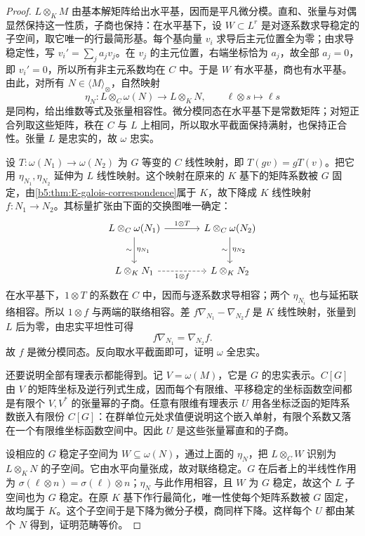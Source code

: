 \begin{proof}
	\(L\otimes_KM\) 由基本解矩阵给出水平基，因而是平凡微分模。直和、张量与对偶显然保持这一性质，子商也保持：在水平基下，设 \(W\subset L^r\) 是对逐系数求导稳定的子空间，取它唯一的行最简形基。每个基向量 \(v_i\) 求导后主元位置全为零；由求导稳定性，写 \(v_i'=\sum_j a_jv_j\)。在 \(v_j\) 的主元位置，右端坐标恰为 \(a_j\)，故全部 \(a_j=0\)，即 \(v_i'=0\)，所以所有非主元系数均在 \(C\) 中。于是 \(W\) 有水平基，商也有水平基。由此，对所有 \(N\in\langle M\rangle_\otimes\)，自然映射
	\[
		\eta_N:L\otimes_C\omega(N)\longrightarrow L\otimes_KN, \qquad \ell\otimes s\longmapsto\ell s
	\]
	是同构，给出维数等式及张量相容性。微分模同态在水平基下是常数矩阵；对短正合列取这些矩阵，秩在 \(C\) 与 \(L\) 上相同，所以取水平截面保持满射，也保持正合性。张量 \(L\) 是忠实的，故 \(\omega\) 忠实。

	设 \(T:\omega(N_1)\to\omega(N_2)\) 为 \(G\) 等变的 \(C\) 线性映射，即 \(T(gv)=gT(v)\)。把它用 \(\eta_{N_1},\eta_{N_2}\) 延伸为 \(L\) 线性映射。这个映射在原来的 \(K\) 基下的矩阵系数被 \(G\) 固定，由\cref{b5:thm:E-galois-correspondence}属于 \(K\)，故下降成 \(K\) 线性映射 \(f:N_1\to N_2\)。其标量扩张由下面的交换图唯一确定：
	\[
		\begin{tikzcd}[column sep=large,row sep=large]
			L\otimes_C\omega(N_1)\arrow[r,"1\otimes T"] \arrow[d,"\eta_{N_1}","\sim"'] &L\otimes_C\omega(N_2)\arrow[d,"\eta_{N_2}","\sim"']\\
			L\otimes_KN_1\arrow[r,dashed,"1\otimes f"']&L\otimes_KN_2
		\end{tikzcd}
	\]
	在水平基下，\(1\otimes T\) 的系数在 \(C\) 中，因而与逐系数求导相容；两个 \(\eta_{N_i}\) 也与延拓联络相容。所以 \(1\otimes f\) 与两端的联络相容。差 \(f\nabla_{N_1}-\nabla_{N_2}f\) 是 \(K\) 线性映射，张量到 \(L\) 后为零，由忠实平坦性可得
	\[
		f\nabla_{N_1}=\nabla_{N_2}f.
	\]
	故 \(f\) 是微分模同态。反向取水平截面即可，证明 \(\omega\) 全忠实。

	还要说明全部有理表示都能得到。记 \(V=\omega(M)\)，它是 \(G\) 的忠实表示。\(C[G]\) 由 \(V\) 的矩阵坐标及逆行列式生成，因而每个有限维、平移稳定的坐标函数空间都是有限个 \(V,V^*\) 的张量幂的子商。任意有限维有理表示 \(U\) 用各坐标泛函的矩阵系数嵌入有限份 \(C[G]\)：在群单位元处求值便说明这个嵌入单射，有限个系数又落在一个有限维坐标函数空间中。因此 \(U\) 是这些张量幂直和的子商。

	设相应的 \(G\) 稳定子空间为 \(W\subseteq\omega(N)\)，通过上面的 \(\eta_N\)，把 \(L\otimes_C W\) 识别为 \(L\otimes_KN\) 的子空间。它由水平向量张成，故对联络稳定。\(G\) 在后者上的半线性作用为 \(\sigma(\ell\otimes n)=\sigma(\ell)\otimes n\)；\(\eta_N\) 与此作用相容，且 \(W\) 为 \(G\) 稳定，故这个 \(L\) 子空间也为 \(G\) 稳定。在原 \(K\) 基下作行最简化，唯一性使每个矩阵系数被 \(G\) 固定，故均属于 \(K\)。这个子空间于是下降为微分子模，商同样下降。这样每个 \(U\) 都由某个 \(N\) 得到，证明范畴等价。


\end{proof}
